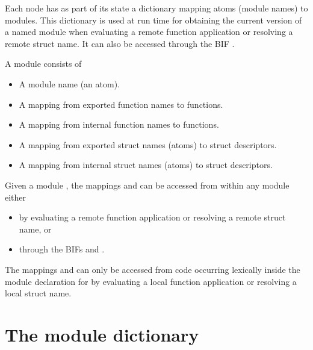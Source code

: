 

Each node  has as part of its state a dictionary
 mapping atoms (module names) to modules.
This dictionary is used at run time for obtaining the
current version of a named module when evaluating
a remote function application or resolving a remote struct name.
It can also be accessed through the BIF .

A module  consists of
\begin{itemize}
\item A module name (an atom).
\item A mapping  from exported function
names to functions.
\item A mapping  from internal function
names to functions.
\item A mapping  from exported struct names
(atoms) to struct descriptors.
\item A mapping  from internal struct names
(atoms) to struct descriptors.
\end{itemize}

Given a module , the mappings  and
 can be accessed from within any module
either
\begin{itemize}
\item by evaluating
a remote function application or resolving a remote struct name, or
\item through the BIFs  and .
\end{itemize}
The mappings  and
 can only be accessed from code occurring
lexically inside the module declaration for  by evaluating a
local function application or resolving a local struct name.

\section{The module dictionary}

